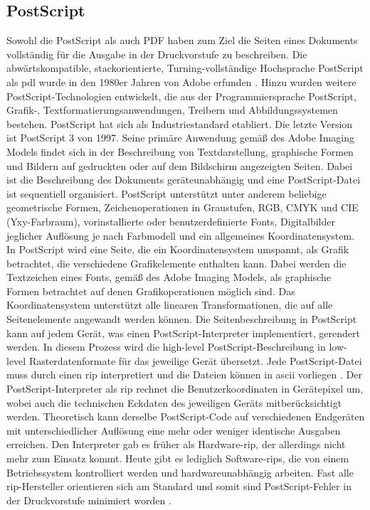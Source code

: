\subsection{PostScript}
Sowohl die PostScript als auch PDF haben zum Ziel die Seiten eines Dokuments vollständig für die Ausgabe in der Druckvorstufe zu beschreiben. Die abwärtskompatible, stackorientierte, Turning-vollständige Hochsprache PostScript als \gls{pdl} wurde in den 1980er Jahren von Adobe erfunden \cite{adobe-postscript, wiki-postscript}. Hinzu wurden weitere PostScript-Technologien entwickelt, die aus der Programmiersprache PostScript, Grafik-, Textformatierungsanwendungen, Treibern und Abbildungssystemen bestehen. PostScript hat sich als Industriestandard etabliert. Die letzte Version ist PostScript 3 von 1997. Seine primäre Anwendung gemäß des Adobe Imaging Models findet sich in der Beschreibung von Textdarstellung, graphische Formen und Bildern auf gedruckten oder auf dem Bildschirm angezeigten Seiten. Dabei ist die Beschreibung des Dokuments geräteunabhängig und eine PostScript-Datei ist sequentiell organisiert. PostScript unterstützt unter anderem beliebige geometrische Formen, Zeichenoperationen in Graustufen, RGB, CMYK und CIE (Yxy-Farbraum),  vorinstallierte oder benutzerdefinierte Fonts, Digitalbilder jeglicher Auflösung je nach Farbmodell und ein allgemeines Koordinatensystem. \\
In PostScript wird eine Seite, die ein Koordinatensystem umspannt, als Grafik betrachtet, die verschiedene Grafikelemente enthalten kann. Dabei werden die Textzeichen eines Fonts, gemäß des Adobe Imaging Models, als graphische Formen betrachtet auf denen Grafikoperationen möglich sind. Das Koordinatensystem unterstützt alle linearen Transformationen, die auf alle Seitenelemente angewandt werden können. Die Seitenbeschreibung in PostScript kann auf jedem Gerät, was einen PostScript-Interpreter implementiert, gerendert werden. In diesem Prozess wird die high-level PostScript-Beschreibung in low-level Rasterdatenformate für das jeweilige Gerät übersetzt. Jede PostScript-Datei muss durch einen \gls{rip} interpretiert und die Dateien können in \gls{ascii} vorliegen \cite{adobe-postscript}. Der PostScript-Interpreter als \gls{rip} rechnet die Benutzerkoordinaten in Gerätepixel um, wobei auch die technischen Eckdaten des jeweiligen Geräts mitberücksichtigt werden. Theoretisch kann derselbe PostScript-Code auf verschiedenen Endgeräten mit unterschiedlicher Auflösung eine mehr oder weniger identische Ausgaben erreichen. Den Interpreter gab es früher als Hardware-\gls{rip}, der allerdings nicht mehr zum Einsatz kommt. Heute gibt es lediglich Software-\gls{rip}s, die von einem Betriebssystem kontrolliert werden und hardwareunabhängig arbeiten. Fast alle \gls{rip}-Hersteller orientieren sich am Standard und somit sind PostScript-Fehler in der Druckvorstufe minimiert worden \cite{schneeberger}.

